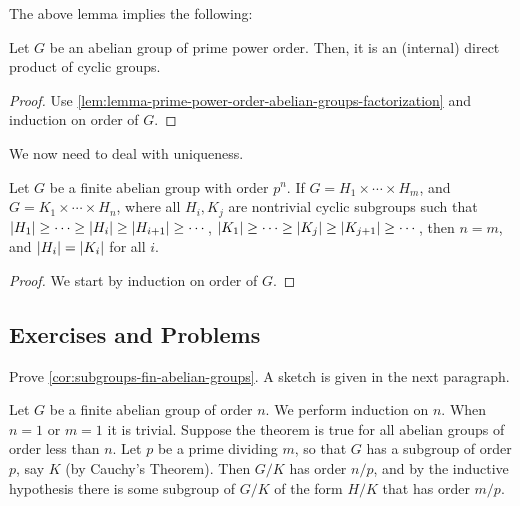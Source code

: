 \documentclass[./main.tex]{subfiles}
\begin{document}
The above lemma implies the following:
\begin{lemma}
    Let $G$ be an abelian group of prime power order. Then, it is an (internal)
    direct product of cyclic groups.
\end{lemma}
\begin{proof}
    Use \cref{lem:lemma-prime-power-order-abelian-groups-factorization} and
    induction on order of $G$.
\end{proof}

We now need to deal with uniqueness.

\begin{lemma}
    Let $G$ be a finite abelian group with order $p^n$. If $G = H_1 \times
    \cdots \times H_m$, and $G = K_1 \times \cdots \times H_n$, where all $H_i,
    K_j$ are nontrivial cyclic subgroups such that $\abs{H_1} \geq \cdots \geq
    \abs{H_i} \geq \abs{H_{i+1}} \geq \cdots$, $\abs{K_1} \geq \cdots \geq
    \abs{K_j} \geq \abs{K_{j+1}} \geq \cdots$, then $n = m$, and $\abs{H_i} =
    \abs{K_i}$ for all $i$.
\end{lemma}
\begin{proof}
    We start by induction on order of $G$. 
\end{proof}


\subsection{Exercises and Problems}

\begin{exercise}
\label{ex:subgroups-fin-abelian-groups}
Prove \cref{cor:subgroups-fin-abelian-groups}. A sketch is given in the next paragraph.

Let $G$ be a finite abelian group of order $n$. We perform induction on $n$.
When $n=1$ or $m=1$ it is trivial. Suppose the theorem is true for all abelian
groups of order less than $n$. Let $p$ be a prime dividing $m$, so that $G$ has
a subgroup of order $p$, say $K$ (by Cauchy's Theorem). Then $G/K$ has order
$n/p$, and by the inductive hypothesis there is some subgroup of $G/K$ of the
form $H/K$ that has order $m/p$.
\end{exercise}
\end{document}
